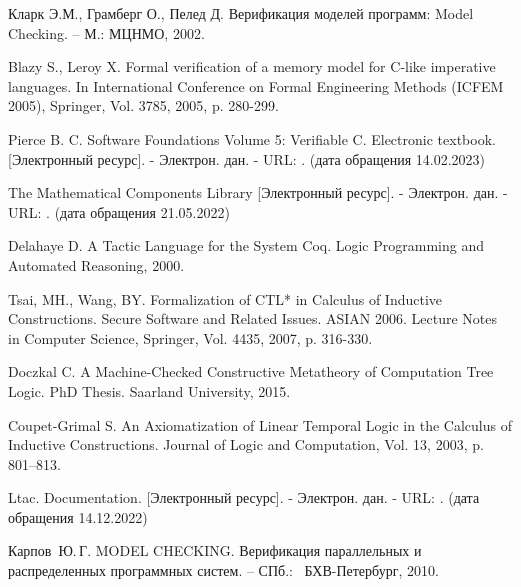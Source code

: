 \documentclass[12pt]{article}
\begin{document}
\newpage
{}%
  \begin{thebibliography}{99}%
   Кларк Э.М., Грамберг О., Пелед Д. Верификация моделей программ: Model Checking. – М.: МЦНМО, 2002.
    
     Blazy S., Leroy X. Formal verification of a memory model for C-like imperative languages. In International Conference on Formal Engineering Methods (ICFEM 2005), Springer, Vol. 3785, 2005, p. 280-299.
    
     Pierce B. C. Software Foundations Volume 5: Verifiable C. Electronic textbook. [Электронный ресурс]. - Электрон. дан. - URL: . (дата обращения 14.02.2023)
    
    The Mathematical Components Library [Электронный ресурс]. - Электрон. дан. - URL: . (дата обращения 21.05.2022)

      Delahaye D. A Tactic Language for the System Coq. Logic Programming and Automated Reasoning, 2000.

     Tsai, MH., Wang, BY. Formalization of CTL* in Calculus of Inductive Constructions. Secure Software and Related Issues. ASIAN 2006. Lecture Notes in Computer Science, Springer, Vol. 4435,  2007, p. 316-330.

     Doczkal C. A Machine-Checked Constructive Metatheory of Computation Tree Logic. PhD Thesis. Saarland University, 2015.

     Coupet-Grimal S. An Axiomatization of Linear Temporal Logic in the Calculus of Inductive Constructions. Journal of Logic and Computation, Vol. 13, 2003, p. 801–813.

     Ltac. Documentation. [Электронный ресурс]. - Электрон. дан. - URL: . (дата обращения 14.12.2022)



    
     Карпов~Ю.\,Г. MODEL CHECKING. Верификация параллельных и распределенных программных систем. -- СПб.: ~БХВ-Петербург, 2010. 


\end{thebibliography}
\end{document}
